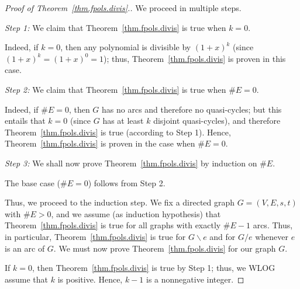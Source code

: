 \documentclass[12pt]{amsart}
\theoremstyle{definition}
\newcommand{\tup}[1]{\left( #1 \right)}
\newcommand{\Pm}[1]{\mathcal{PM}\left(#1\right)}
\newcommand{\Pf}[1]{\mathcal{PF}\left(#1\right)}
\begin{document}
\begin{proof}[Proof of Theorem~\ref{thm.fpols.divis}.]
We proceed in multiple steps.

\textit{Step 1:}
We claim that Theorem~\ref{thm.fpols.divis} is true when $k = 0$.

Indeed, if $k = 0$, then any polynomial is divisible by $\tup{1+x}^k$ (since $\tup{1+x}^k = \tup{1+x}^0 = 1$); thus, Theorem~\ref{thm.fpols.divis} is proven in this case.


\textit{Step 2:}
We claim that Theorem~\ref{thm.fpols.divis} is true when $\# E = 0$.

Indeed, if $\# E = 0$, then $G$ has no arcs and
therefore no quasi-cycles;
but this entails that $k = 0$
(since $G$ has at least $k$ disjoint quasi-cycles),
and therefore Theorem~\ref{thm.fpols.divis} is true (according to Step 1).
Hence, Theorem~\ref{thm.fpols.divis} is proven in the case when $\# E = 0$.

\textit{Step 3:}
We shall now prove Theorem~\ref{thm.fpols.divis} by induction on $\# E$.

The base case ($\# E = 0$) follows from Step 2.

Thus, we proceed to the induction step.
We fix a directed graph $G = \tup{V, E, s, t}$ with $\# E > 0$,
and we assume (as induction hypothesis) that Theorem~\ref{thm.fpols.divis} is true for all graphs with exactly $\# E - 1$ arcs.
Thus, in particular, Theorem~\ref{thm.fpols.divis} is true for $G \backslash e$ and for $G / e$ whenever $e$ is an arc of $G$.
We must now prove Theorem~\ref{thm.fpols.divis} for our graph $G$.

If $k = 0$, then Theorem~\ref{thm.fpols.divis} is true by Step 1; thus, we WLOG assume that $k$ is positive.
Hence, $k-1$ is a nonnegative integer.




\end{proof}
\end{document}
